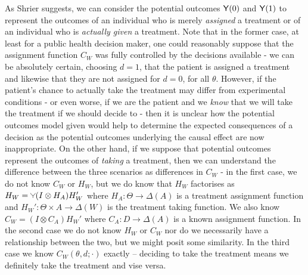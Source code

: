 As Shrier suggests, we can consider the potential outcomes $\mathsf{Y}(0)$ and $\mathsf{Y}(1)$ to represent the outcomes of an individual who is merely \emph{assigned} a treatment or of an individual who is \emph{actually given} a treatment. Note that in the former case, at least for a public health decision maker, one could reasonably suppose that the assignment function $C_W$ was fully controlled by the decisions available - we can be absolutely certain, choosing $d=1$, that the patient is assigned a treatment and likewise that they are not assigned for $d=0$, for all $\theta$. However, if the patient's chance to actually take the treatment may differ from experimental conditions - or even worse, if we are the patient and we \emph{know} that we will take the treatment if we should decide to - then it is unclear how the potential outcomes model given would help to determine the expected consequences of a decision as the potential outcomes underlying the causal effect are now inappropriate. On the other hand, if we suppose that potential outcomes represent the outcomes of \emph{taking} a treatment, then we can understand the difference between the three scenarios as differences in $C_W$ - in the first case, we do not know $C_W$ or $H_W$, but we do know that $H_W$ factorises as $H_W = \splitter{0.1}(I\otimes H_A)H_W'$ where $H_A:\Theta\to \Delta(A)$ is a treatment assignment function and $H_W':\Theta\times A\to \Delta(W)$ is the treatment taking function. We also know $C_W = (I\otimes C_A) H_W'$ where $C_A:D\to \Delta(A)$ is a known assignment function. In the second case we do not know $H_W$ or $C_W$ nor do we necessarily have a relationship between the two, but we might posit some similarity. In the third case we know $C_W(\theta,d;\cdot)$ exactly -- deciding to take the treatment means we definitely take the treatment and vise versa.


